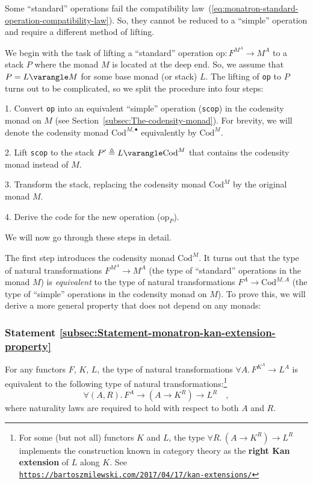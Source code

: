 Some \textsf{``}standard\textsf{''} operations fail the compatibility law~(\ref{eq:monatron-standard-operation-compatibility-law}).
So, they cannot be reduced to a \textsf{``}simple\textsf{''} operation and require
a different method of lifting.

We begin with the task of lifting a \textsf{``}standard\textsf{''} operation $\text{op}:F^{M^{A}}\rightarrow M^{A}$
to a stack $P$ where the monad $M$ is located at the deep end. So,
we assume that $P=L\varangle M$ for some base monad (or stack) $L$.
The lifting of \lstinline!op! to $P$ turns out to be complicated,
so we split the procedure into four steps:

1. Convert \lstinline!op! into an equivalent \textsf{``}simple\textsf{''} operation
(\lstinline!scop!) in the codensity 
monad on $M$ (see Section~\ref{subsec:The-codensity-monad}). For
brevity, we will denote the codensity monad $\text{Cod}^{M,\bullet}$
equivalently by $\text{Cod}^{M}$.

2. Lift \lstinline!scop! to the stack $P^{\prime}\triangleq L\varangle\text{Cod}^{M}$
that contains the codensity monad instead of $M$.

3. Transform the stack, replacing the codensity monad $\text{Cod}^{M}$
by the original monad $M$.

4. Derive the code for the new operation ($\text{op}_{P}$).

We will now go through these steps in detail. 

The first step introduces the codensity monad $\text{Cod}^{M}$. It
turns out that the type of natural transformations $F^{M^{A}}\rightarrow M^{A}$
(the type of \textsf{``}standard\textsf{''} operations in the monad $M$) is \emph{equivalent}
to the type of natural transformations $F^{A}\rightarrow\text{Cod}^{M,A}$
(the type of \textsf{``}simple\textsf{''} operations in the codensity monad on $M$).
To prove this, we will derive a more general property that does not
depend on any monads:

\subsubsection{Statement \label{subsec:Statement-monatron-kan-extension-property}\ref{subsec:Statement-monatron-kan-extension-property}}

For any functors $F$, $K$, $L$, the type of natural transformations
$\forall A.\,F^{K^{A}}\rightarrow L^{A}$ is equivalent to the following
type of natural transformations:\footnote{For some (but not all) functors $K$ and $L$, the type $\forall R.\,(A\rightarrow K^{R})\rightarrow L^{R}$
implements the construction known in category theory as the \textbf{right
Kan extension} of
$L$ along $K$. See \texttt{\href{https://bartoszmilewski.com/2017/04/17/kan-extensions/}{https://bartoszmilewski.com/2017/04/17/kan-extensions/}}}
\[
\forall(A,R).\,F^{A}\rightarrow(A\rightarrow K^{R})\rightarrow L^{R}\quad,
\]
where naturality laws are required to hold with respect to both $A$
and $R$.

